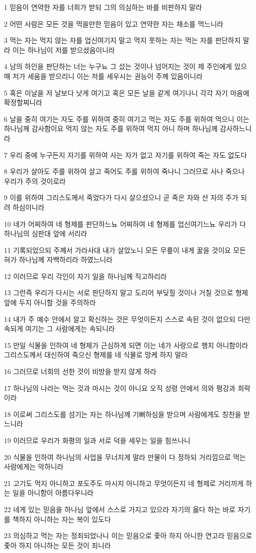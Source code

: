 \par 1 믿음이 연약한 자를 너희가 받되 그의 의심하는 바를 비판하지 말라
\par 2 어떤 사람은 모든 것을 먹을만한 믿음이 있고 연약한 자는 채소를 먹느니라
\par 3 먹는 자는 먹지 않는 자를 업신여기지 말고 먹지 못하는 자는 먹는 자를 판단하지 말라 이는 하나님이 저를 받으셨음이니라
\par 4 남의 하인을 판단하는 너는 누구뇨 그 섰는 것이나 넘어지는 것이 제 주인에게 있으매 저가 세움을 받으리니 이는 저를 세우시는 권능이 주께 있음이니라
\par 5 혹은 이날을 저 날보다 낫게 여기고 혹은 모든 날을 같게 여기나니 각각 자기 마음에 확정할찌니라
\par 6 날을 중히 여기는 자도 주를 위하여 중히 여기고 먹는 자도 주를 위하여 먹으니 이는 하나님께 감사함이요 먹지 않는 자도 주를 위하여 먹지 아니 하며 하나님께 감사하느니라
\par 7 우리 중에 누구든지 자기를 위하여 사는 자가 없고 자기를 위하여 죽는 자도 없도다
\par 8 우리가 살아도 주를 위하여 살고 죽어도 주를 위하여 죽나니 그러므로 사나 죽으나 우리가 주의 것이로라
\par 9 이를 위하여 그리스도께서 죽었다가 다시 살으셨으니 곧 죽은 자와 산 자의 주가 되려 하심이니라
\par 10 네가 어찌하여 네 형제를 판단하느뇨 어찌하여 네 형제를 업신여기느뇨 우리가 다 하나님의 심판대 앞에 서리라
\par 11 기록되었으되 주께서 가라사대 내가 살았노니 모든 무릎이 내게 꿇을 것이요 모든 혀가 하나님께 자백하리라 하였느니라
\par 12 이러므로 우리 각인이 자기 일을 하나님께 직고하리라
\par 13 그런즉 우리가 다시는 서로 판단하지 말고 도리어 부딪힐 것이나 거칠 것으로 형제 앞에 두지 아니할 것을 주의하라
\par 14 내가 주 예수 안에서 알고 확신하는 것은 무엇이든지 스스로 속된 것이 없으되 다만 속되게 여기는 그 사람에게는 속되니라
\par 15 만일 식물을 인하여 네 형제가 근심하게 되면 이는 네가 사랑으로 행치 아니함이라 그리스도께서 대신하여 죽으신 형제를 네 식물로 망케 하지 말라
\par 16 그러므로 너희의 선한 것이 비방을 받지 않게 하라
\par 17 하나님의 나라는 먹는 것과 마시는 것이 아니요 오직 성령 안에서 의와 평강과 희락이라
\par 18 이로써 그리스도를 섬기는 자는 하나님께 기뻐하심을 받으며 사람에게도 칭찬을 받느니라
\par 19 이러므로 우리가 화평의 일과 서로 덕을 세우는 일을 힘쓰나니
\par 20 식물을 인하여 하나님의 사업을 무너지게 말라 만물이 다 정하되 거리낌으로 먹는 사람에게는 악하니라
\par 21 고기도 먹지 아니하고 포도주도 마시지 아니하고 무엇이든지 네 형제로 거리끼게 하는 일을 아니함이 아름다우니라
\par 22 네게 있는 믿음을 하나님 앞에서 스스로 가지고 있으라 자기의 옳다 하는 바로 자기를 책하지 아니하는 자는 복이 있도다
\par 23 의심하고 먹는 자는 정죄되었나니 이는 믿음으로 좇아 하지 아니한 연고라 믿음으로 좇아 하지 아니하는 모든 것이 죄니라

